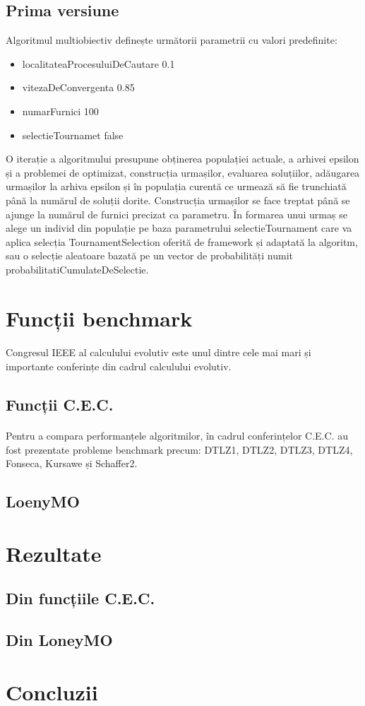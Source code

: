 \documentclass[12pt]{article}
\begin{document}
\subsection{Prima versiune}
Algoritmul multiobiectiv definește următorii parametrii cu valori predefinite:
\begin{itemize}
    \item localitateaProcesuluiDeCautare 0.1
    \item vitezaDeConvergenta 0.85
    \item numarFurnici 100
    \item selectieTournamet false
\end{itemize}
O iterație a algoritmului presupune obținerea populației actuale, a arhivei epsilon și a problemei de optimizat, construcția urmașilor, evaluarea soluțiilor, adăugarea urmașilor la arhiva epsilon și în populația curentă ce urmează să fie trunchiată până la numărul de soluții dorite.
Construcția urmașilor se face treptat până se ajunge la numărul de furnici precizat ca parametru. În formarea unui urmaș se alege un individ din populație pe baza parametrului selectieTournament care va aplica selecția TournamentSelection oferită de framework și adaptată la algoritm, sau o selecție aleatoare bazată pe un vector de probabilități numit probabilitatiCumulateDeSelectie.
\section{Funcții benchmark}
\paragraph{}
Congresul IEEE al calculului evolutiv este unul dintre cele mai mari și importante conferințe din cadrul calculului evolutiv.
\subsection{Funcții C.E.C.}
\paragraph{}
Pentru a compara performanțele algoritmilor, în cadrul conferințelor C.E.C. au fost prezentate probleme benchmark precum: DTLZ1, DTLZ2, DTLZ3, DTLZ4, Fonseca, Kursawe și Schaffer2.
\subsection{LoenyMO}
\section{Rezultate}
\subsection{Din funcțiile C.E.C.}
\subsection{Din LoneyMO}
\section{Concluzii}
\newpage
\printbibliography
\end{document}
